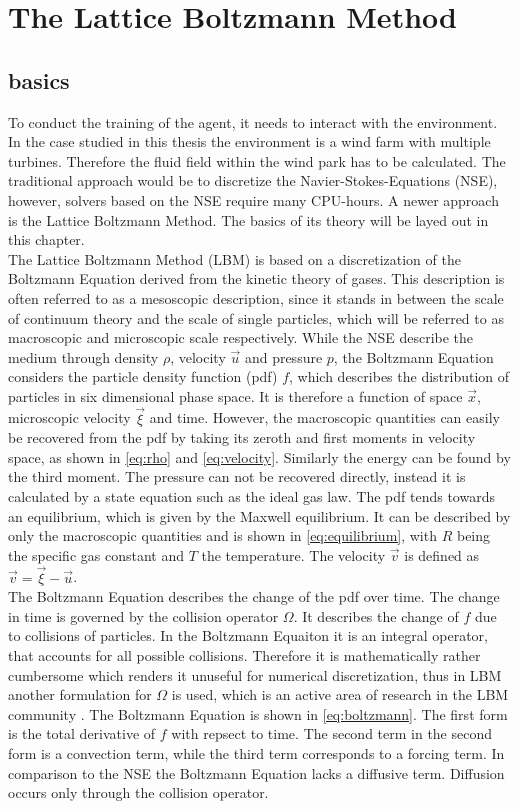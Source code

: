 \section{The Lattice Boltzmann Method}
\label{sec:LBM}
\subsection{basics}
To conduct the training of the agent, it needs to interact with the environment. In the case studied in this thesis the environment is a wind farm with multiple turbines. Therefore the fluid field within the wind park has to be calculated. The traditional approach would be to discretize the Navier-Stokes-Equations (NSE), however, solvers based on the NSE require many CPU-hours. A newer approach is the Lattice Boltzmann Method. The basics of its theory will be layed out in this chapter. \\ 
The Lattice Boltzmann Method (LBM) is based on a discretization of the Boltzmann Equation derived from the kinetic theory of gases. This description is often referred to as a mesoscopic description, since it stands in  between the scale of continuum theory and the scale of single particles, which will be referred to as macroscopic and microscopic scale respectively. While the NSE describe the medium through density $\rho$, velocity $\vec{u}$ and pressure $p$, the Boltzmann Equation considers the particle density function (pdf) $f$, which describes the distribution of particles in six dimensional phase space. It is therefore a function of space $\vec{x}$, microscopic velocity $\vec{\xi}$ and time. However, the macroscopic quantities can easily be recovered from the pdf by taking its zeroth and first moments in velocity space, as shown in \eqref{eq:rho} and \eqref{eq:velocity}. Similarly the energy can be found by the third moment. The pressure can not be recovered directly, instead it is calculated by a state equation such as the ideal gas law. The pdf tends towards an equilibrium, which is given by the Maxwell equilibrium. It can be described by only the macroscopic quantities and is shown in \eqref{eq:equilibrium}, with $R$ being the specific gas constant and $T$ the temperature. The velocity $\vec{v}$ is defined as $\vec{v} = \vec{\xi}-\vec{u}$.\cite[p. 15- 21]{kruger_lattice_2017} \\
The Boltzmann Equation describes the change of the pdf over time. The change in time is governed by the collision operator $\Omega$. It describes the change of $f$ due to collisions of particles. In the Boltzmann Equaiton it is an integral operator, that accounts for all possible collisions. Therefore it is mathematically rather cumbersome which renders it unuseful for numerical discretization, thus in LBM another formulation for $\Omega$ is used, which is an active area of research in the LBM community \cite{coreixas_comprehensive_2019}. The Boltzmann Equation is shown in \eqref{eq:boltzmann}. The first form is the total derivative of $f$ with repsect to time. The second term in the second form is a convection term, while the third term corresponds to a forcing term. In comparison to the NSE the Boltzmann Equation lacks a diffusive term. Diffusion occurs only through the collision operator. \cite[p. 21]{kruger_lattice_2017}
